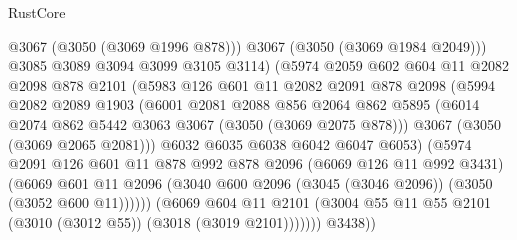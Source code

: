 \begin{lexlean}{RustCore}
\begin{coremodule}
                              @3067
                              (@3050 (@3069 @1996 @878)))
                            @3067
                            (@3050 (@3069 @1984 @2049)))
                          @3085
                          @3089
                          @3094
                          @3099
                          @3105
                          @3114)
                        (@5974
                          @2059
                          @602
                          @604
                          @11
                          @2082
                          @2098
                          @878
                          @2101
                          (@5983
                            @126
                            @601
                            @11
                            @2082
                            @2091
                            @878
                            @2098
                            (@5994
                              @2082
                              @2089
                              @1903
                              (@6001
                                @2081
                                @2088
                                @856
                                @2064
                                @862
                                @5895
                                (@6014 @2074 @862 @5442 @3063 @3067 (@3050 (@3069 @2075 @878)))
                                @3067
                                (@3050 (@3069 @2065 @2081)))
                              @6032
                              @6035
                              @6038
                              @6042
                              @6047
                              @6053)
                            (@5974
                              @2091
                              @126
                              @601
                              @11
                              @878
                              @992
                              @878
                              @2096
                              (@6069 @126 @11 @992 @3431)
                              (@6069
                                @601
                                @11
                                @2096
                                (@3040 @600 @2096 (@3045 (@3046 @2096)) (@3050 (@3052 @600 @11))))))
                          (@6069
                            @604
                            @11
                            @2101
                            (@3004 @55 @11 @55 @2101 (@3010 (@3012 @55)) (@3018 (@3019 @2101)))))))
                    @3438))

\end{coremodule}
\end{lexlean}
